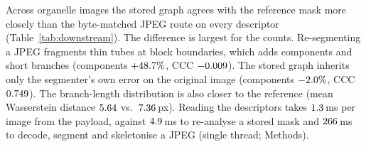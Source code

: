 \documentclass[10pt,a4paper]{article}
\begin{document}
Across \DsN{} organelle images the stored graph agrees with the reference
mask more closely than the byte-matched JPEG route on every descriptor
(Table~\ref{tab:downstream}). The difference is largest for the counts.
Re-segmenting a JPEG fragments thin tubes at block boundaries, which adds
components and short branches (components $+48.7\%$,
CCC $-0.009$). The stored graph inherits only the
segmenter's own error on the original image (components
$-2.0\%$, CCC $0.749$). The
branch-length distribution is also closer to the reference (mean
Wasserstein distance $5.64$ vs.\ $7.36$\,px). Reading the
descriptors takes $1.3$\,ms per image from the payload, against
$4.9$\,ms to re-analyse a stored mask and $266$\,ms to
decode, segment and skeletonise a JPEG (single thread; Methods).
\end{document}

